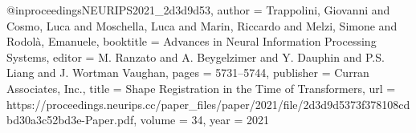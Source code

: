@inproceedings{NEURIPS2021_2d3d9d53,
 author = {Trappolini, Giovanni and Cosmo, Luca and Moschella, Luca and Marin, Riccardo and Melzi, Simone and Rodol\`{a}, Emanuele},
 booktitle = {Advances in Neural Information Processing Systems},
 editor = {M. Ranzato and A. Beygelzimer and Y. Dauphin and P.S. Liang and J. Wortman Vaughan},
 pages = {5731--5744},
 publisher = {Curran Associates, Inc.},
 title = {Shape Registration in the Time of Transformers},
 url = {https://proceedings.neurips.cc/paper_files/paper/2021/file/2d3d9d5373f378108cdbd30a3c52bd3e-Paper.pdf},
 volume = {34},
 year = {2021}
}
